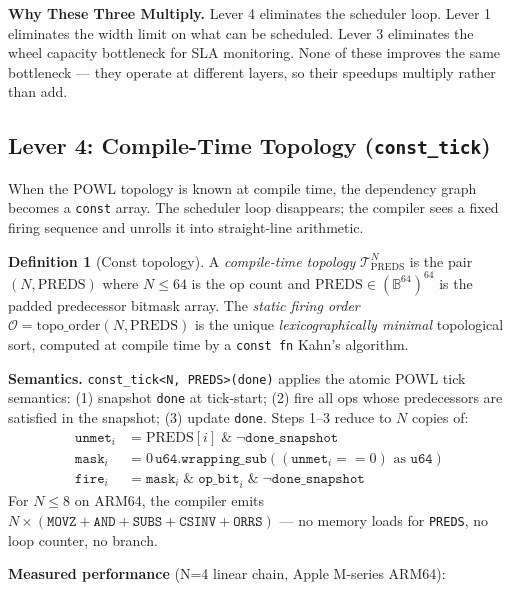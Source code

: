 \documentclass[12pt,a4paper]{article}
\theoremstyle{definition}
\newtheorem{definition}[theorem]{Definition}
\theoremstyle{remark}
\newcommand{\execinsight}[2]{%
  \begin{execbox}
    \textbf{\color{chatblue}#1}\quad #2
  \end{execbox}}
\begin{document}
\execinsight{Why These Three Multiply.}{%
Lever 4 eliminates the scheduler loop.
Lever 1 eliminates the width limit on what can be scheduled.
Lever 3 eliminates the wheel capacity bottleneck for SLA monitoring.
None of these improves the same bottleneck — they operate at different layers,
so their speedups multiply rather than add.}

\subsection{Lever 4: Compile-Time Topology (\texttt{const\_tick})}

When the POWL topology is known at compile time, the dependency graph becomes
a \texttt{const} array.
The scheduler loop disappears; the compiler sees a fixed firing sequence and
unrolls it into straight-line arithmetic.

\begin{definition}[Const topology]
A \emph{compile-time topology} $\mathcal{T}^N_{\mathrm{PREDS}}$ is the pair $(N, \mathrm{PREDS})$
where $N \leq 64$ is the op count and $\mathrm{PREDS} \in (\mathbb{B}^{64})^{64}$ is the
padded predecessor bitmask array.
The \emph{static firing order} $\mathcal{O} = \mathrm{topo\_order}(N, \mathrm{PREDS})$
is the unique \emph{lexicographically minimal} topological sort, computed at
compile time by a \texttt{const fn} Kahn's algorithm.
\end{definition}

\textbf{Semantics.}
\texttt{const\_tick<N,~PREDS>(done)} applies the atomic POWL tick semantics:
(1) snapshot \texttt{done} at tick-start;
(2) fire all ops whose predecessors are satisfied in the snapshot;
(3) update \texttt{done}.
Steps 1–3 reduce to $N$ copies of:
\begin{align*}
\texttt{unmet}_i &= \mathrm{PREDS}[i] \;\&\; \lnot\texttt{done\_snapshot} \\
\texttt{mask}_i  &= 0\,\mathtt{u64.wrapping\_sub}((\texttt{unmet}_i == 0) \text{ as } \texttt{u64}) \\
\texttt{fire}_i  &= \texttt{mask}_i \;\&\; \texttt{op\_bit}_i \;\&\; \lnot\texttt{done\_snapshot}
\end{align*}
For $N \leq 8$ on ARM64, the compiler emits $N \times (\texttt{MOVZ} + \texttt{AND} + \texttt{SUBS} + \texttt{CSINV} + \texttt{ORRS})$ — no memory loads for \texttt{PREDS}, no loop counter, no branch.

\textbf{Measured performance} (N=4 linear chain, Apple M-series ARM64):
\end{document}
